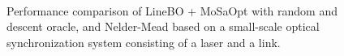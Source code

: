 \documentclass{ifacconf}
\begin{document}
\begin{figure}[tb]
	\centering
  \\
  \caption{Performance comparison of LineBO + MoSaOpt with random and descent oracle, and Nelder-Mead based on a small-scale optical synchronization system consisting of a laser and a link.}
  \label{fig:lab_comparison}
\end{figure}
\end{document}
